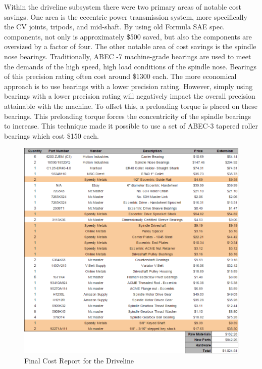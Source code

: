 Within the driveline subsystem there were two primary areas of notable cost savings. One area is the eccentric power transmission system, more specifically the CV joints, tripods, and mid-shaft. By using old Formula SAE spec. components, not only is approximately \$500 saved, but also the components are oversized by a factor of four. The other notable area of cost savings is the spindle nose bearings. Traditionally, ABEC -7 machine-grade bearings are used to meet the demands of the high speed, high load conditions of the spindle nose. Bearings of this precision rating often cost around \$1300 each.  The more economical approach is to use bearings with a lower precision rating. However, simply using bearings with a lower precision rating will negatively impact the overall precision attainable with the machine. To offset this, a preloading torque is placed on these bearings. This preloading torque forces the concentricity of the spindle bearings to increase. This technique made it possible to use a set of ABEC-3 tapered roller bearings which cost \$150 each. 

\begin{figure}[htp]
    \centering
    \includegraphics[width=1.0\textwidth]{./images/Chapter4-BillofMaterials/FCRD}
    \caption{Final Cost Report for the Driveline}
    \label{fig:CRD}
\end{figure}


